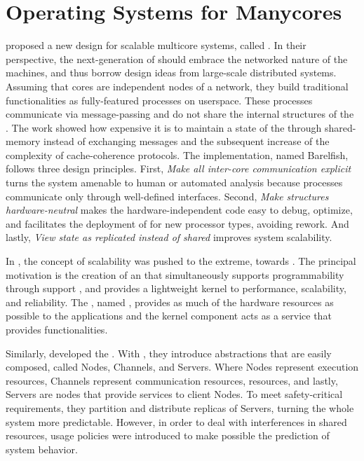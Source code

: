 \section{Operating Systems for Manycores}
\label{sec.works.os}

	 proposed a new \os design for scalable multicore
	systems, called \multikernel.
	In their perspective, the next-generation of \oss should embrace the networked nature
	of the machines, and thus borrow design ideas from large-scale distributed
	systems.
	Assuming that cores are independent nodes of a network, they build traditional
	\os functionalities as fully-featured processes on userspace.
	These processes communicate via message-passing and do not share the internal
	structures of the \os.
	The work showed how expensive it is to maintain a state of the \os through
	shared-memory instead of exchanging messages and the subsequent increase of
	the complexity of cache-coherence protocols.
	The \multikernel implementation, named Barelfish, follows three design principles.
	First, \textit{Make all inter-core communication explicit} turns the system
	amenable to human or automated analysis because processes communicate only
	through well-defined interfaces.
	Second, \textit{Make \os structures hardware-neutral} makes the hardware-independent
	code easy to debug, optimize, and facilitates the deployment of \os for new
	processor types, avoiding rework.
	And lastly, \textit{View \os state as replicated instead of shared} improves system
	scalability.

	In , the concept of scalability was pushed
	to the extreme, towards \hpc.
	The principal motivation is the creation of an \os that simultaneously supports
	programmability through support \linux \api, and provides a lightweight kernel
	to performance, scalability, and reliability.
	The \os, named \mos, provides as much of the hardware resources as
	possible to the \hpc applications and the \linux kernel component
	acts as a service that provides \linux functionalities.

	Similarly,  developed the \moosca.
	With \moosca, they introduce abstractions that are easily composed, called Nodes,
	Channels, and Servers.
	Where Nodes represent execution resources, Channels represent communication
	resources, \eg \noc resources, and lastly, Servers are nodes that provide
	services to client Nodes.
	To meet safety-critical requirements, they partition \manycore and distribute
	replicas of Servers, turning the whole system more predictable.
	However, in order to deal with interferences in shared resources,
	usage policies were introduced to make possible the prediction of system behavior.


